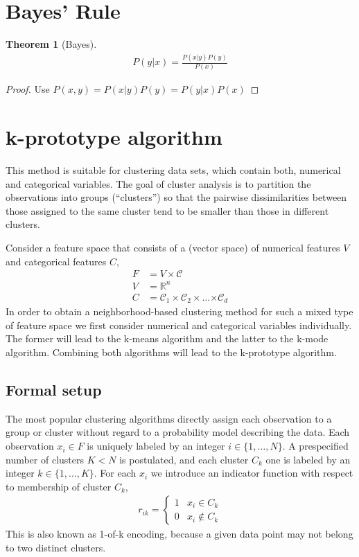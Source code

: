 \documentclass[10pt,a4paper]{article}
\newtheorem{theorem}{Theorem}
\begin{document}
\section{Bayes' Rule}
\begin{theorem}[Bayes]
\begin{align}
P(y|x) = \frac{P(x|y) P(y)}{P(x)}
\end{align}
\end{theorem}
\begin{proof}
Use $P(x,y) = P(x|y)P(y)= P(y|x)P(x)$
\end{proof}
\section{k-prototype algorithm}
This method is suitable for clustering data sets, which contain both, numerical and categorical variables.
The goal of cluster analysis is to partition the observations into groups
(“clusters”) so that the pairwise dissimilarities between those assigned to
the same cluster tend to be smaller than those in different clusters.

Consider a feature space that consists of a (vector space) of numerical features $V$ and categorical features $C$,
\begin{align}
F &= V \times \mathcal C \\
V &= \mathbb R^n\\
C &= \mathcal C_1 \times \mathcal C_2 \times \dots \mathcal \times \mathcal C_d
\end{align}
In order to obtain a neighborhood-based clustering method for such a mixed type of feature space we first consider numerical and categorical variables individually. The former will lead to the k-means algorithm and the latter to the k-mode algorithm. Combining both algorithms will lead to the k-prototype algorithm. 

\subsection{Formal setup}
The most popular clustering algorithms directly assign each observation
to a group or cluster without regard to a probability model describing the
data. Each observation $x_i \in F$ is uniquely labeled by an integer $i \in \{1,\dots, N \}$. A prespecified number of clusters $K < N$ is postulated, and each cluster $C_k$ one is
labeled by an integer $k \in \{1, \dots , K\}$.
For each $x_i$ we introduce an indicator function with respect to  membership of cluster $C_k$,
\begin{align}
 r_{ik} = \begin{cases} 
1 &  x_i \in C_k\\
0 &   x_i \not\in C_k
\end{cases}
\end{align}
This is also known as 1-of-k encoding, because a given data point may not belong to two distinct clusters. 
\end{document}
